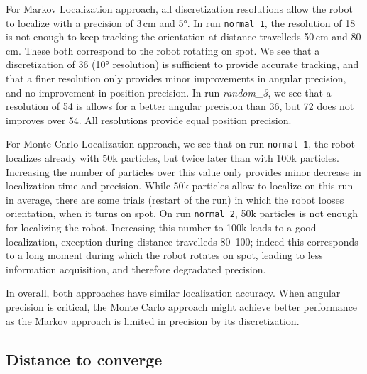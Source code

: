 \documentclass[letterpaper, 10pt, conference]{ieeeconf}
\begin{document}
For Markov Localization approach, all discretization resolutions allow the robot to localize with a precision of 3\,cm and 5°.
In run \texttt{normal 1}, the resolution of 18 is not enough to keep tracking the orientation at distance travelleds 50\,cm and 80\,cm.
These both correspond to the robot rotating on spot.
We see that a discretization of 36 (10° resolution) is sufficient to provide accurate tracking, and that a finer resolution only provides minor improvements in angular precision, and no improvement in position precision.
In run \emph{random\_3}, we see that a resolution of 54 is allows for a better angular precision than 36, but 72 does not improves over 54.
All resolutions provide equal position precision.

For Monte Carlo Localization approach, we see that on run \texttt{normal 1}, the robot localizes already with 50k particles, but twice later than with 100k particles.
Increasing the number of particles over this value only provides minor decrease in localization time and precision.
While 50k particles allow to localize on this run in average, there are some trials (restart of the run) in which the robot looses orientation, when it turns on spot.
On run \texttt{normal 2}, 50k particles is not enough for localizing the robot.
Increasing this number to 100k leads to a good localization, exception during distance travelleds 80--100; indeed this corresponds to a long moment during which the robot rotates on spot, leading to less information acquisition, and therefore degradated precision.

In overall, both approaches have similar localization accuracy.
When angular precision is critical, the Monte Carlo approach might achieve better performance as the Markov approach is limited in precision by its discretization.


\subsection{Distance to converge}
\end{document}
